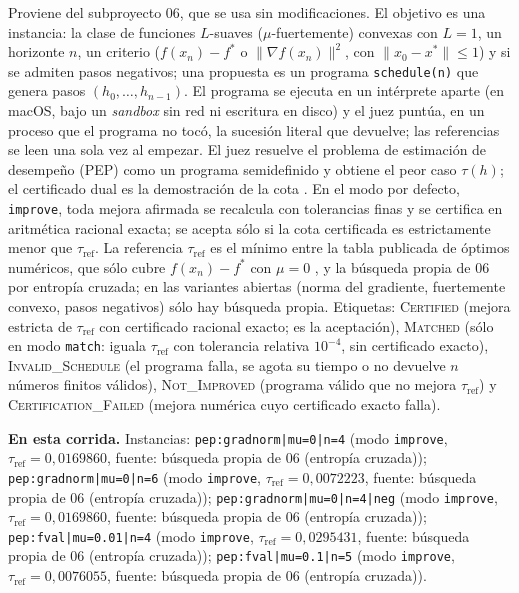 \documentclass[11pt,a4paper]{article}
\begin{document}
Proviene del subproyecto 06, que se usa sin modificaciones. El objetivo es una instancia: la clase de funciones $L$-suaves ($\mu$-fuertemente) convexas con $L = 1$, un horizonte $n$, un criterio ($f(x_n) - f^*$ o $\|\nabla f(x_n)\|^2$, con $\|x_0 - x^*\| \le 1$) y si se admiten pasos negativos; una propuesta es un programa \texttt{schedule(n)} que genera pasos $(h_0,\dots,h_{n-1})$. El programa se ejecuta en un intérprete aparte (en macOS, bajo un \emph{sandbox} sin red ni escritura en disco) y el juez puntúa, en un proceso que el programa no tocó, la sucesión literal que devuelve; las referencias se leen una sola vez al empezar. El juez resuelve el problema de estimación de desempeño (PEP) como un programa semidefinido y obtiene el peor caso $\tau(h)$; el certificado dual es la demostración de la cota \citep{DroriTeboulle2014,TaylorHendrickxGlineur2017}. En el modo por defecto, \texttt{improve}, toda mejora afirmada se recalcula con tolerancias finas y se certifica en aritmética racional exacta; se acepta sólo si la cota certificada es estrictamente menor que $\tau_{\mathrm{ref}}$. La referencia $\tau_{\mathrm{ref}}$ es el mínimo entre la tabla publicada de óptimos numéricos, que sólo cubre $f(x_n) - f^*$ con $\mu = 0$ \citep{DasGuptaVanParysRyu2024,GrimmerShuWang2024}, y la búsqueda propia de 06 por entropía cruzada; en las variantes abiertas (norma del gradiente, fuertemente convexo, pasos negativos) sólo hay búsqueda propia. Etiquetas: \textsc{Certified} (mejora estricta de $\tau_{\mathrm{ref}}$ con certificado racional exacto; es la aceptación), \textsc{Matched} (sólo en modo \texttt{match}: iguala $\tau_{\mathrm{ref}}$ con tolerancia relativa $10^{-4}$, sin certificado exacto), \textsc{Invalid\_Schedule} (el programa falla, se agota su tiempo o no devuelve $n$ números finitos válidos), \textsc{Not\_Improved} (programa válido que no mejora $\tau_{\mathrm{ref}}$) y \textsc{Certification\_Failed} (mejora numérica cuyo certificado exacto falla).

\textbf{En esta corrida.} Instancias: \texttt{pep:\allowbreak{}gradnorm|\allowbreak{}mu=\allowbreak{}0|\allowbreak{}n=\allowbreak{}4} (modo \texttt{improve}, $\tau_{\mathrm{ref}} = 0{,}0169860$, fuente: búsqueda propia de 06 (entropía cruzada)); \texttt{pep:\allowbreak{}gradnorm|\allowbreak{}mu=\allowbreak{}0|\allowbreak{}n=\allowbreak{}6} (modo \texttt{improve}, $\tau_{\mathrm{ref}} = 0{,}0072223$, fuente: búsqueda propia de 06 (entropía cruzada)); \texttt{pep:\allowbreak{}gradnorm|\allowbreak{}mu=\allowbreak{}0|\allowbreak{}n=\allowbreak{}4|\allowbreak{}neg} (modo \texttt{improve}, $\tau_{\mathrm{ref}} = 0{,}0169860$, fuente: búsqueda propia de 06 (entropía cruzada)); \texttt{pep:\allowbreak{}fval|\allowbreak{}mu=\allowbreak{}0.01|\allowbreak{}n=\allowbreak{}4} (modo \texttt{improve}, $\tau_{\mathrm{ref}} = 0{,}0295431$, fuente: búsqueda propia de 06 (entropía cruzada)); \texttt{pep:\allowbreak{}fval|\allowbreak{}mu=\allowbreak{}0.1|\allowbreak{}n=\allowbreak{}5} (modo \texttt{improve}, $\tau_{\mathrm{ref}} = 0{,}0076055$, fuente: búsqueda propia de 06 (entropía cruzada)).
\end{document}
